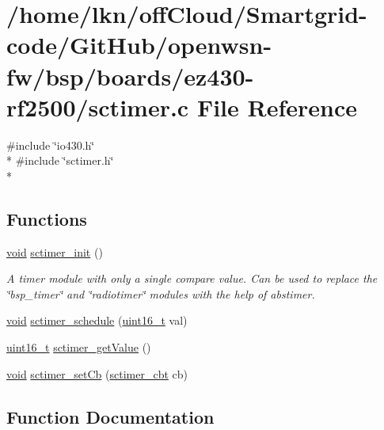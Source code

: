\hypertarget{ez430-rf2500_2sctimer_8c}{}\section{/home/lkn/off\+Cloud/\+Smartgrid-\/code/\+Git\+Hub/openwsn-\/fw/bsp/boards/ez430-\/rf2500/sctimer.c File Reference}
\label{ez430-rf2500_2sctimer_8c}
{\ttfamily \#include \char`\"{}io430.\+h\char`\"{}}\\*
{\ttfamily \#include \char`\"{}sctimer.\+h\char`\"{}}\\*
\subsection*{Functions}
\begin{DoxyCompactItemize}
\item 
\hyperlink{usb__devapi_8h_afabf60e7f57651d6d595a02c75f07cd0}{void} \hyperlink{group__sctimer_ga69345c421ed09ef37ffb53cf392f9c65}{sctimer\+\_\+init} ()
\begin{DoxyCompactList}\small\item\em A timer module with only a single compare value. Can be used to replace the \char`\"{}bsp\+\_\+timer\char`\"{} and \char`\"{}radiotimer\char`\"{} modules with the help of abstimer. \end{DoxyCompactList}\item 
\hyperlink{usb__devapi_8h_afabf60e7f57651d6d595a02c75f07cd0}{void} \hyperlink{ez430-rf2500_2sctimer_8c_a054db7016ecd0ae3f61f6704a9b0274d}{sctimer\+\_\+schedule} (\hyperlink{_p_e___types_8h_a1f1825b69244eb3ad2c7165ddc99c956}{uint16\+\_\+t} val)
\item 
\hyperlink{_p_e___types_8h_a1f1825b69244eb3ad2c7165ddc99c956}{uint16\+\_\+t} \hyperlink{group__sctimer_ga5d432097f53b624c10030ce92d8dc0f8}{sctimer\+\_\+get\+Value} ()
\item 
\hyperlink{usb__devapi_8h_afabf60e7f57651d6d595a02c75f07cd0}{void} \hyperlink{group__sctimer_gac5a05074749b0e138c23e0342bad5690}{sctimer\+\_\+set\+Cb} (\hyperlink{group__sctimer_ga0a0d5fd87809e69b643e507977c2f8e4}{sctimer\+\_\+cbt} cb)
\end{DoxyCompactItemize}


\subsection{Function Documentation}
